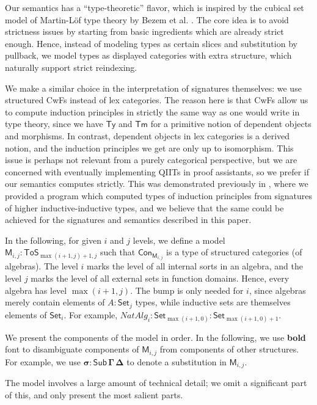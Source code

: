\documentclass{article}
\theoremstyle{definition}
\theoremstyle{theorem}
\newcommand{\Con}{\mathsf{Con}}
\newcommand{\Sub}{\mathsf{Sub}}
\newcommand{\Tm}{\mathsf{Tm}}
\newcommand{\Ty}{\mathsf{Ty}}
\newcommand{\Set}{\mathsf{Set}}
\newcommand{\ToS}{\mathsf{ToS}}
\newcommand{\mi}[1]{\mathit{#1}}
\newcommand{\bM}{\boldsymbol{\mathsf{M}}}
\begin{document}
Our semantics has a ``type-theoretic'' flavor, which is inspired by the cubical
set model of Martin-Löf type theory by Bezem et al. \cite{cubicalmodel}. The core idea
is to avoid strictness issues by starting from basic ingredients which are already
strict enough. Hence, instead of modeling types as certain slices and
substitution by pullback, we model types as displayed categories with extra
structure, which naturally support strict reindexing.

We make a similar choice in the interpretation of signatures themselves: we use
structured CwFs instead of lex categories. The reason here is that CwFs allow us
to compute induction principles in strictly the same way as one would write in
type theory, since we have $\Ty$ and $\Tm$ for a primitive notion of dependent
objects and morphisms. In contrast, dependent objects in lex categories is a
derived notion, and the induction principles we get are only up to
isomorphism. This issue is perhaps not relevant from a purely categorical
perspective, but we are concerned with eventually implementing QIITs in proof
assistants, so we prefer if our semantics computes strictly. This was
demonstrated previously in \cite{hiit}, where we provided a program which
computed types of induction principles from signatures of higher
inductive-inductive types, and we believe that the same could be achieved for
the signatures and semantics described in this paper.

In the following, for given $i$ and $j$ levels, we define a model $\bM_{i,j} :
\ToS_{\max(i+1,j)+1, j}$ such that $\Con_{\bM_{i,j}}$ is a type of structured
categories (of algebras). The level $i$ marks the level of all internal sorts in
an algebra, and the level $j$ marks the level of all external sets in function
domains. Hence, every algebra has level $\max(i+1,j)$. The bump is only needed
for $i$, since algebras merely contain elements of $A : \Set_j$ types, while
inductive sets are themselves elements of $\Set_i$. For example, $\mi{NatAlg}_i :
\Set_{\max(i+1,0)} : \Set_{\max(i+1, 0)+1}$.


We present the components of the model in order. In the following, we use
\textbf{bold} font to disambiguate components of $\bM_{i,j}$ from components of other
structures. For example, we use $\boldsymbol{\sigma : \Sub\,\Gamma\,\Delta}$ to
denote a substitution in $\bM_{i,j}$.

The model involves a large amount of technical detail; we omit a significant
part of this, and only present the most salient parts.
\end{document}
